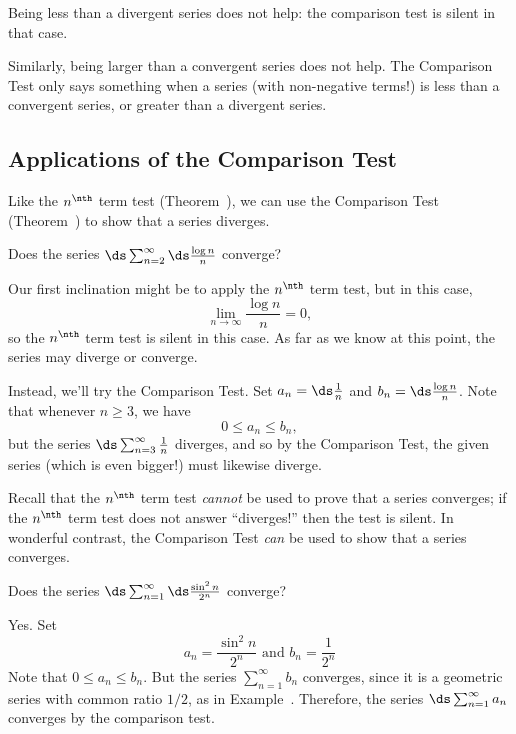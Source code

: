 \begin{warning}
  Being less than a divergent series does not help: the comparison
  test is silent in that case.

  Similarly, being larger than a convergent series does not help.
  The Comparison Test only says something when a series (with non-negative terms!) is less than a
  convergent series, or greater than a divergent series.
\end{warning}

\subsection{Applications of the Comparison Test}

Like the $n^{\nth}$ term test (Theorem~), we
can use the Comparison Test (Theorem~) to
show that a series diverges.

\begin{example}
Does the series $\ds\sum_{n=2}^\infty \ds\frac{\log n}{n}$ converge?
\end{example}

\begin{solution}
Our first inclination might be to apply the $n^{\nth}$ term test, but in this case,
$$
\lim_{n \to \infty} \frac{\log n}{n} = 0,
$$
so the $n^{\nth}$ term test is silent in this case.  As far as we know
at this point, the series may diverge or converge.

Instead, we'll try the Comparison Test.  Set $a_n = \ds\frac{1}{n}$ and $b_n = \ds\frac{\log n}{n}$.  Note that whenever $n \geq 3$, we have
$$
0 \leq a_n \leq b_n,
$$
but the series $\ds\sum_{n=3}^\infty \frac{1}{n}$ diverges, and so by
the Comparison Test, the given series (which is even bigger!) must
likewise diverge.
\end{solution}

Recall that the $n^{\nth}$ term test \textit{cannot} be used to prove that a series converges; if the $n^{\nth}$ term test does not answer ``diverges!'' then the test is silent.  In wonderful contrast, the Comparison Test \textit{can} be used to show that a series converges.

\begin{example}
Does the series $\ds\sum_{n=1}^\infty \ds\frac{\sin^2 n}{2^n}$ converge?
\end{example}

\begin{solution}
Yes.  Set
$$
a_n = \frac{\sin^2 n}{2^n} \mbox{ and } b_n = \frac{1}{2^n}
$$
Note that $0 \leq a_n \leq b_n$.  But the series $\sum_{n=1}^\infty
b_n$ converges, since it is a geometric series with common ratio
$1/2$, as in Example~.  Therefore,
the series $\ds\sum_{n=1}^\infty a_n$ converges by the comparison
test.
\end{solution}

